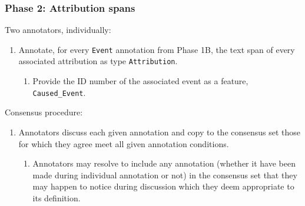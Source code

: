 \documentclass[a4paper,12pt]{article}
\begin{document}
    \subsubsection{Phase 2: Attribution spans}
    Two annotators, individually:
        \begin{enumerate}
            \item Annotate, for every \texttt{Event} annotation from Phase 1B, the text span of every associated attribution as type \texttt{Attribution}.
                \begin{enumerate}
                    \item Provide the ID number of the associated event as a feature, \texttt{Caused\_Event}.
                \end{enumerate}
        \end{enumerate}
    Consensus procedure:
        \begin{enumerate}
            \item Annotators discuss each given annotation and copy to the consensus set those for which they agree meet all given annotation conditions.
                \begin{enumerate}
                    \item Annotators may resolve to include any annotation (whether it have been made during individual annotation or not) in the consensus set that they may happen to notice during discussion which they deem appropriate to its definition.
                \end{enumerate}
        \end{enumerate}
\end{document}
